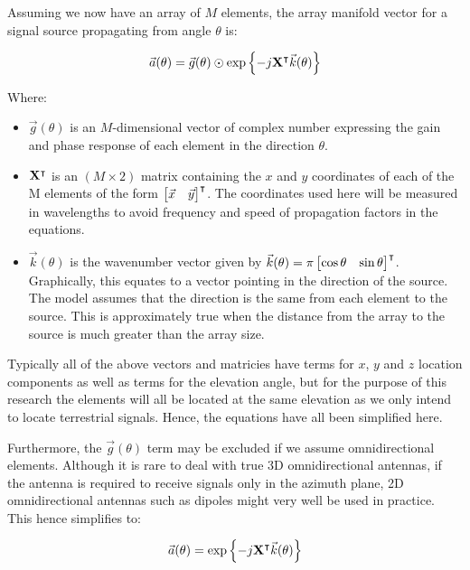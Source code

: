 Assuming we now have an array of \(M\) elements, the array manifold vector for a signal source propagating from angle \(\theta\) is: \cite{dacos1995estimating}

\begin{equation}
\vec{a}(\theta) = \vec{g}(\theta) \odot \exp \left\{ -j \mathbf{X}^\intercal \vec{k}(\theta) \right\}
\end{equation}

Where:
\begin{itemize}
  \item \(\vec{g}(\theta)\) is an \(M\)-dimensional vector of complex number expressing the gain and phase response  of each element in the direction \(\theta\). 
\item \(\mathbf{X}^\intercal\) is an \((M \times 2)\) matrix containing the \(x\) and \(y\) coordinates of each of the M elements of the form \(\begin{bmatrix} \vec{x} & \vec{y} \end{bmatrix}^\intercal\). The coordinates used here will be measured in wavelengths to avoid frequency and speed of propagation factors in the equations.
\item \(\vec{k}(\theta)\) is the wavenumber vector given by \(\vec{k}(\theta) = \pi \begin{bmatrix} \cos\theta & \sin\theta \end{bmatrix}^\intercal \). Graphically, this equates to a vector pointing in the direction of the source. The model assumes that the direction is the same from each element to the source. This is approximately true when the distance from the array to the source is much greater than the array size.
\end{itemize}

Typically all of the above vectors and matricies have terms for \(x\), \(y\) and \(z\) location components as well as terms for the elevation angle, but for the purpose of this research the elements will all be located at the same elevation as we only intend to locate terrestrial signals. Hence, the equations have all been simplified here.

Furthermore, the \(\vec{g}(\theta)\) term may be excluded if we assume omnidirectional elements. Although it is rare to deal with true 3D omnidirectional antennas, if the antenna is required to receive signals only in the azimuth plane, 2D omnidirectional antennas such as dipoles might very well be used in practice. This hence simplifies to:

\begin{equation}
  \vec{a}(\theta) = \exp \left\{ -j \mathbf{X}^\intercal \vec{k}(\theta) \right\}
\end{equation}

